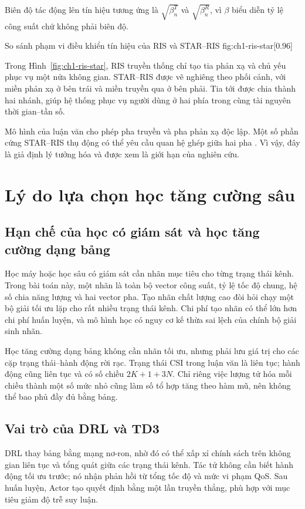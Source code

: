 Biên độ tác động lên tín hiệu tương ứng là $\sqrt{\beta_n^T}$ và $\sqrt{\beta_n^R}$, vì $\beta$ biểu diễn tỷ lệ công suất chứ không phải biên độ.

{So sánh phạm vi điều khiển tín hiệu của RIS và STAR--RIS}
{fig:ch1-ris-star}[0.96\linewidth]

Trong Hình~\ref{fig:ch1-ris-star}, RIS truyền thống chỉ tạo tia phản xạ và chủ yếu phục vụ một nửa không gian. STAR--RIS được vẽ nghiêng theo phối cảnh, với miền phản xạ ở bên trái và miền truyền qua ở bên phải. Tia tới được chia thành hai nhánh, giúp hệ thống phục vụ người dùng ở hai phía trong cùng tài nguyên thời gian--tần số.

Mô hình của luận văn cho phép pha truyền và pha phản xạ độc lập. Một số phần cứng STAR--RIS thụ động có thể yêu cầu quan hệ ghép giữa hai pha \cite{Liu2021STARCoupledPhase,Wang2022STAROptimization}. Vì vậy, đây là giả định lý tưởng hóa và được xem là giới hạn của nghiên cứu.

\section{Lý do lựa chọn học tăng cường sâu}
\subsection{Hạn chế của học có giám sát và học tăng cường dạng bảng}
Học máy hoặc học sâu có giám sát cần nhãn mục tiêu cho từng trạng thái kênh. Trong bài toán này, một nhãn là toàn bộ vector công suất, tỷ lệ tốc độ chung, hệ số chia năng lượng và hai vector pha. Tạo nhãn chất lượng cao đòi hỏi chạy một bộ giải tối ưu lặp cho rất nhiều trạng thái kênh. Chi phí tạo nhãn có thể lớn hơn chi phí huấn luyện, và mô hình học có nguy cơ kế thừa sai lệch của chính bộ giải sinh nhãn.

Học tăng cường dạng bảng không cần nhãn tối ưu, nhưng phải lưu giá trị cho các cặp trạng thái--hành động rời rạc. Trạng thái CSI trong luận văn là liên tục; hành động cũng liên tục và có số chiều $2K+1+3N$. Chỉ riêng việc lượng tử hóa mỗi chiều thành một số mức nhỏ cũng làm số tổ hợp tăng theo hàm mũ, nên không thể bao phủ đầy đủ bằng bảng.

\subsection{Vai trò của DRL và TD3}
DRL thay bảng bằng mạng nơ-ron, nhờ đó có thể xấp xỉ chính sách trên không gian liên tục và tổng quát giữa các trạng thái kênh. Tác tử không cần biết hành động tối ưu trước; nó nhận phản hồi từ tổng tốc độ và mức vi phạm QoS. Sau huấn luyện, Actor tạo quyết định bằng một lần truyền thẳng, phù hợp với mục tiêu giảm độ trễ suy luận.

